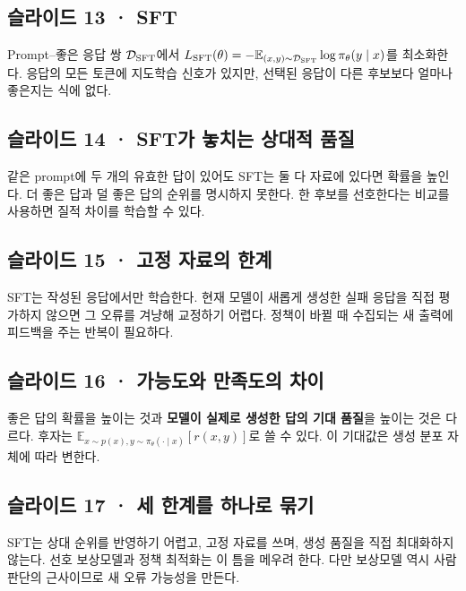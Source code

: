 \documentclass[11pt,a4paper]{article}
\begin{document}
\subsection{슬라이드 13 · SFT}

Prompt–좋은 응답 쌍 $\mathcal D_{\rm SFT}$에서 $L_{\rm SFT}(\theta)=-\mathbb E_{(x,y)\sim\mathcal D_{\rm SFT}}\log\pi_\theta(y\mid x)$를 최소화한다. 응답의 모든 토큰에 지도학습 신호가 있지만, 선택된 응답이 다른 후보보다 얼마나 좋은지는 식에 없다.\par

\subsection{슬라이드 14 · SFT가 놓치는 상대적 품질}

같은 prompt에 두 개의 유효한 답이 있어도 SFT는 둘 다 자료에 있다면 확률을 높인다. 더 좋은 답과 덜 좋은 답의 순위를 명시하지 못한다. 한 후보를 선호한다는 비교를 사용하면 질적 차이를 학습할 수 있다.\par

\subsection{슬라이드 15 · 고정 자료의 한계}

SFT는 작성된 응답에서만 학습한다. 현재 모델이 새롭게 생성한 실패 응답을 직접 평가하지 않으면 그 오류를 겨냥해 교정하기 어렵다. 정책이 바뀔 때 수집되는 새 출력에 피드백을 주는 반복이 필요하다.\par

\subsection{슬라이드 16 · 가능도와 만족도의 차이}

좋은 답의 확률을 높이는 것과 \textbf{모델이 실제로 생성한 답의 기대 품질}을 높이는 것은 다르다. 후자는 $\mathbb E_{x\sim p(x),y\sim\pi_\theta(\cdot\mid x)}[r(x,y)]$로 쓸 수 있다. 이 기대값은 생성 분포 자체에 따라 변한다.\par

\subsection{슬라이드 17 · 세 한계를 하나로 묶기}

SFT는 상대 순위를 반영하기 어렵고, 고정 자료를 쓰며, 생성 품질을 직접 최대화하지 않는다. 선호 보상모델과 정책 최적화는 이 틈을 메우려 한다. 다만 보상모델 역시 사람 판단의 근사이므로 새 오류 가능성을 만든다.\par
\end{document}
